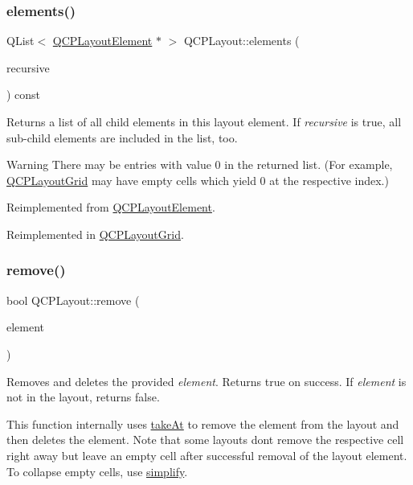 \subsubsection{\texorpdfstring{elements()}{elements()}}
{\footnotesize\ttfamily Q\+List$<$ \hyperlink{classQCPLayoutElement}{Q\+C\+P\+Layout\+Element} $\ast$ $>$ Q\+C\+P\+Layout\+::elements (\begin{DoxyParamCaption}\item[{bool}]{recursive }\end{DoxyParamCaption}) const\hspace{0.3cm}{\ttfamily [virtual]}}

Returns a list of all child elements in this layout element. If {\itshape recursive} is true, all sub-\/child elements are included in the list, too.

\begin{DoxyWarning}{Warning}
There may be entries with value 0 in the returned list. (For example, \hyperlink{classQCPLayoutGrid}{Q\+C\+P\+Layout\+Grid} may have empty cells which yield 0 at the respective index.) 
\end{DoxyWarning}


Reimplemented from \hyperlink{classQCPLayoutElement_a76dec8cb31e498994a944d7647a43309}{Q\+C\+P\+Layout\+Element}.



Reimplemented in \hyperlink{classQCPLayoutGrid_a7d5b968b4cf57393e9e387976d91f8f7}{Q\+C\+P\+Layout\+Grid}.

\mbox{\label{classQCPLayout_a6c58f537d8086f352576ab7c5b15d0bc}} 
\subsubsection{\texorpdfstring{remove()}{remove()}}
{\footnotesize\ttfamily bool Q\+C\+P\+Layout\+::remove (\begin{DoxyParamCaption}\item[{\hyperlink{classQCPLayoutElement}{Q\+C\+P\+Layout\+Element} $\ast$}]{element }\end{DoxyParamCaption})}

Removes and deletes the provided {\itshape element}. Returns true on success. If {\itshape element} is not in the layout, returns false.

This function internally uses \hyperlink{classQCPLayout_a5a79621fa0a6eabb8b520cfc04fb601a}{take\+At} to remove the element from the layout and then deletes the element. Note that some layouts don\textquotesingle{}t remove the respective cell right away but leave an empty cell after successful removal of the layout element. To collapse empty cells, use \hyperlink{classQCPLayout_a41e6ac049143866e8f8b4964efab01b2}{simplify}.

